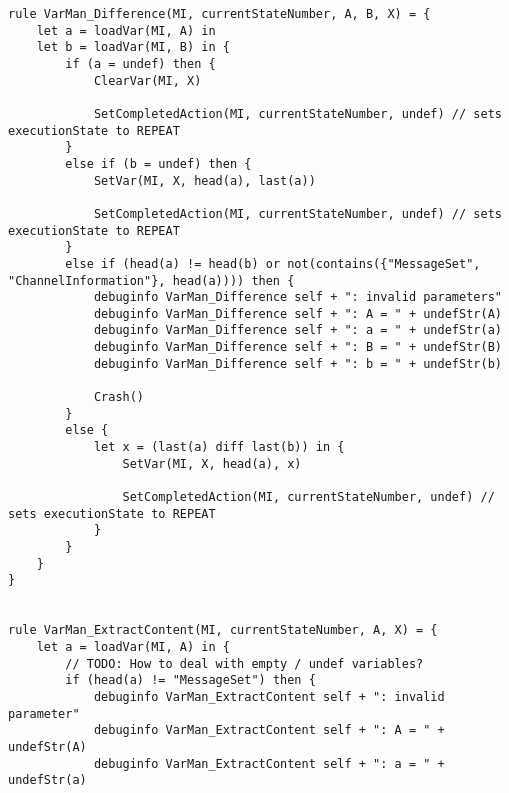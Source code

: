 \begin{listing}[H]
\begin{verbatim}
rule VarMan_Difference(MI, currentStateNumber, A, B, X) = {
    let a = loadVar(MI, A) in
    let b = loadVar(MI, B) in {
        if (a = undef) then {
            ClearVar(MI, X)

            SetCompletedAction(MI, currentStateNumber, undef) // sets executionState to REPEAT
        }
        else if (b = undef) then {
            SetVar(MI, X, head(a), last(a))

            SetCompletedAction(MI, currentStateNumber, undef) // sets executionState to REPEAT
        }
        else if (head(a) != head(b) or not(contains({"MessageSet", "ChannelInformation"}, head(a)))) then {
            debuginfo VarMan_Difference self + ": invalid parameters"
            debuginfo VarMan_Difference self + ": A = " + undefStr(A)
            debuginfo VarMan_Difference self + ": a = " + undefStr(a)
            debuginfo VarMan_Difference self + ": B = " + undefStr(B)
            debuginfo VarMan_Difference self + ": b = " + undefStr(b)

            Crash()
        }
        else {
            let x = (last(a) diff last(b)) in {
                SetVar(MI, X, head(a), x)

                SetCompletedAction(MI, currentStateNumber, undef) // sets executionState to REPEAT
            }
        }
    }
}


rule VarMan_ExtractContent(MI, currentStateNumber, A, X) = {
    let a = loadVar(MI, A) in {
        // TODO: How to deal with empty / undef variables?
        if (head(a) != "MessageSet") then {
            debuginfo VarMan_ExtractContent self + ": invalid parameter"
            debuginfo VarMan_ExtractContent self + ": A = " + undefStr(A)
            debuginfo VarMan_ExtractContent self + ": a = " + undefStr(a)


\end{verbatim}
\end{listing}
